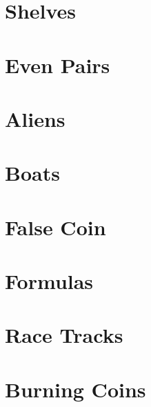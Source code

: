 \documentclass[a4paper, 10pt]{article}
\let\stdsection\section
\renewcommand\section{\newpage\stdsection}
\newcommand{\includecode}[1]{
    }
\newcommand{\algoAuthor}{2} %
\begin{document}
    \section{Shelves}
        \label{sec:shelves}
        \includecode{../problems/w01/Shelves/Shelves\algoAuthor.cpp}
        
    \section{Even Pairs}
        \label{sec:even_pairs}
        \includecode{../problems/w01/Shelves/Shelves\algoAuthor.cpp}
    
    
    \section{Aliens}
        \label{sec:aliens}
        \includecode{../problems/w02/Aliens/Aliens\algoAuthor.cpp}
        
    \section{Boats}
        \label{sec:boats}
        \includecode{../problems/w02/Boats/Boats\algoAuthor.cpp}
        
    \section{False Coin}
        \label{sec:false_coin}
        \includecode{../problems/w02/False_Coin/FalseCoin\algoAuthor.cpp}
        
    \section{Formulas}
        \includecode{../problems/w02/Formulas/Formulas\algoAuthor.cpp}
        
    \section{Race Tracks}
        \includecode{../problems/w02/Race_Tracks/RaceTracks\algoAuthor.cpp}

    
    \section{Burning Coins}
        \includecode{../problems/w03/Burning_Coins/BurningCoins\algoAuthor.cpp}
        
\end{document}
